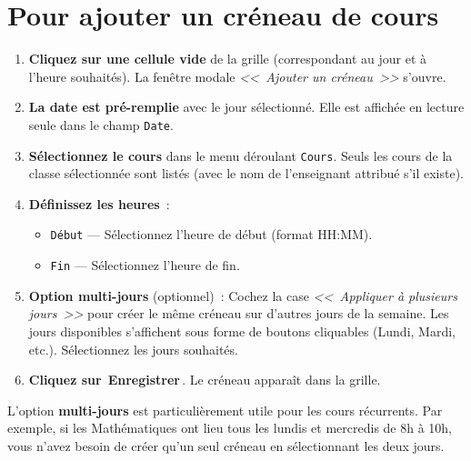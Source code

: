 \documentclass[12pt,a4paper]{report}
\newcommand{\bouton}[1]{{\colorbox{emerald}{\small\sffamily\bfseries\color{white}\,#1\,}}}
\newcommand{\champ}[1]{\texttt{\color{violet}#1}}
\begin{document}
\section{Pour ajouter un cr\'eneau de cours}

\begin{etape}[title=Proc\'edure d\'etaill\'ee : Ajouter un cr\'eneau]
\begin{enumerate}[leftmargin=1.5cm,label=\textbf{\arabic*.},itemsep=12pt]
  \item \textbf{Cliquez sur une cellule vide} de la grille (correspondant au jour et \`a l'heure souhait\'es). La fen\^etre modale \textit{<<~Ajouter un cr\'eneau~>>} s'ouvre.

  \item \textbf{La date est pr\'e-remplie} avec le jour s\'electionn\'e. Elle est affich\'ee en lecture seule dans le champ \champ{Date}.

  \item \textbf{S\'electionnez le cours} dans le menu d\'eroulant \champ{Cours}. Seuls les cours de la classe s\'electionn\'ee sont list\'es (avec le nom de l'enseignant attribu\'e s'il existe).

  \item \textbf{D\'efinissez les heures}~:
  \begin{itemize}
    \item \champ{D\'ebut} --- S\'electionnez l'heure de d\'ebut (format HH:MM).
    \item \champ{Fin} --- S\'electionnez l'heure de fin.
  \end{itemize}

  \item \textbf{Option multi-jours} (optionnel)~: Cochez la case \textit{<<~Appliquer \`a plusieurs jours~>>} pour cr\'eer le m\^eme cr\'eneau sur d'autres jours de la semaine. Les jours disponibles s'affichent sous forme de boutons cliquables (Lundi, Mardi, etc.). S\'electionnez les jours souhait\'es.

  \item \textbf{Cliquez sur} \bouton{Enregistrer}. Le cr\'eneau appara\^it dans la grille.
\end{enumerate}
\end{etape}

\begin{astuce}
L'option \textbf{multi-jours} est particuli\`erement utile pour les cours r\'ecurrents. Par exemple, si les Math\'ematiques ont lieu tous les lundis et mercredis de 8h \`a 10h, vous n'avez besoin de cr\'eer qu'un seul cr\'eneau en s\'electionnant les deux jours.
\end{astuce}
\end{document}
